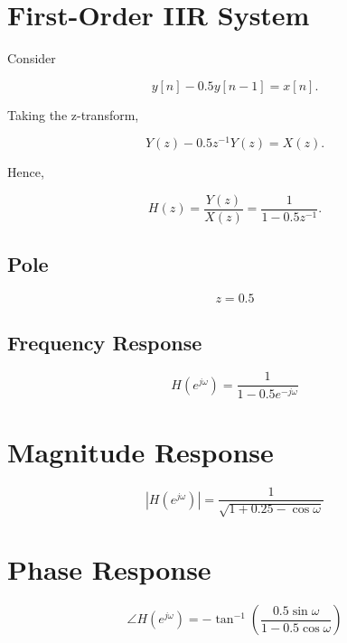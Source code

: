 
\section{First-Order IIR System}

Consider

\[
y[n]-0.5y[n-1]=x[n].
\]

Taking the z-transform,

\[
Y(z)-0.5z^{-1}Y(z)=X(z).
\]

Hence,

\[
H(z)=
\frac{Y(z)}{X(z)}
=
\frac{1}{1-0.5z^{-1}}.
\]


\subsection{Pole}

\[
z=0.5
\]


\subsection{Frequency Response}

\[
\boxed{
H(e^{j\omega})=
\frac{1}{1-0.5e^{-j\omega}}
}
\]


\section{Magnitude Response}

\[
|H(e^{j\omega})|=
\frac{1}
{\sqrt{1+0.25-\cos\omega}}
\]


\section{Phase Response}

\[
\angle H(e^{j\omega})=
-\tan^{-1}
\left(
\frac{0.5\sin\omega}
{1-0.5\cos\omega}
\right)
\]


